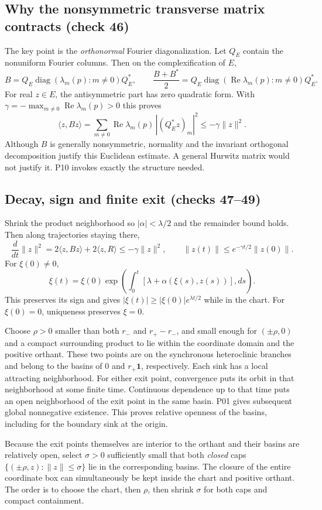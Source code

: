 \documentclass[11pt]{article}
\newcommand{\one}{\mathbf1}
\newcommand{\Ree}{\operatorname{Re}}
\newcommand{\norm}[1]{\lVert#1\rVert}
\begin{document}
\subsection{Why the nonsymmetric transverse matrix contracts (check 46)}
The key point is the \emph{orthonormal} Fourier diagonalization. Let $Q_E$
contain the nonuniform Fourier columns. Then on the complexification of $E$,
\[
 B=Q_E\operatorname{diag}(\lambda_m(p):m\ne0)Q_E^*,\qquad
 \frac{B+B^*}{2}
 =Q_E\operatorname{diag}(\Ree\lambda_m(p):m\ne0)Q_E^*.
\]
For real $z\in E$, the antisymmetric part has zero quadratic form. With
$\gamma=-\max_{m\ne0}\Ree\lambda_m(p)>0$ this proves
\[
 \langle z,Bz\rangle
 =\sum_{m\ne0}\Ree\lambda_m(p)\,|(Q_E^*z)_m|^2
 \le-\gamma\norm z^2.
\]
Although $B$ is generally nonsymmetric, normality and the invariant
orthogonal decomposition justify this Euclidean estimate. A general Hurwitz
matrix would not justify it. P10 invokes exactly the structure needed.

\subsection{Decay, sign and finite exit (checks 47--49)}
Shrink the product neighborhood so $|\alpha|<\lambda/2$ and the remainder
bound holds. Then along trajectories staying there,
\[
 \frac d{dt}\norm z^2
 =2\langle z,Bz\rangle+2\langle z,R\rangle
 \le-\gamma\norm z^2,
 \qquad \norm{z(t)}\le e^{-\gamma t/2}\norm{z(0)}.
\]
For $\xi(0)\ne0$,
\[
 \xi(t)=\xi(0)\exp\!\left(\int_0^t
       [\lambda+\alpha(\xi(s),z(s))],ds\right).
\]
This preserves its sign and gives $|\xi(t)|\ge|\xi(0)|e^{\lambda t/2}$
while in the chart. For $\xi(0)=0$, uniqueness preserves $\xi=0$.

Choose $\rho>0$ smaller than both $r_-$ and $r_+-r_-$, and small enough
for $(\pm\rho,0)$ and a compact surrounding product to lie within the
coordinate domain and the positive orthant. These two points are on the
synchronous heteroclinic branches and belong to the basins of $0$ and
$r_+\one$, respectively. Each sink has a local attracting neighborhood.
For either exit point, convergence puts its orbit in that neighborhood at
some finite time. Continuous dependence up to that time puts an open
neighborhood of the exit point in the same basin. P01 gives subsequent
global nonnegative existence. This proves relative openness of the basins,
including for the boundary sink at the origin.

Because the exit points themselves are interior to the orthant and their
basins are relatively open, select $\sigma>0$ sufficiently small that both
\emph{closed} caps
$\{(\pm\rho,z):\norm z\le\sigma\}$ lie in the corresponding basins.
The closure of the entire coordinate box can simultaneously be kept inside
the chart and positive orthant. The order is to choose the chart, then $\rho$,
then shrink $\sigma$ for both caps and compact containment.
\end{document}
